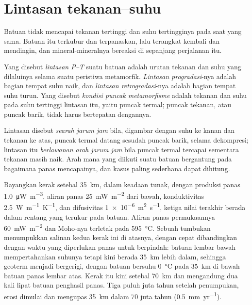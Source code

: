\section{Lintasan tekanan--suhu}\label{sec:b2:pt-paths:paths}

Batuan tidak mencapai tekanan tertinggi dan suhu tertingginya pada saat yang sama.
Batuan itu terkubur dan terpanaskan, lalu terangkat kembali dan mendingin, dan mineral-mineralnya bereaksi di sepanjang
perjalanan itu.

\begin{definition}\label{def:b2:pt-paths:paths}
Yang disebut \emph{lintasan P--T} suatu batuan adalah urutan tekanan dan
suhu yang dilaluinya selama suatu peristiwa metamorfik. \emph{Lintasan
progradasi}-nya adalah bagian tempat suhu naik, dan \emph{lintasan
retrogradasi}-nya adalah bagian tempat suhu turun. Yang disebut \emph{kondisi puncak
metamorfisme} adalah tekanan dan suhu pada
suhu tertinggi lintasan itu, yaitu puncak termal; puncak tekanan, atau puncak barik, tidak
harus bertepatan dengannya.
\end{definition}

Lintasan disebut \emph{searah jarum jam} bila, digambar dengan suhu ke kanan dan tekanan ke atas,
puncak termal datang sesudah puncak barik, selama dekompresi; lintasan itu
\emph{berlawanan arah jarum jam} bila puncak termal tercapai sementara tekanan masih naik. Arah
mana yang diikuti suatu batuan bergantung pada bagaimana panas mencapainya, dan kasus paling sederhana dapat
dihitung.

Bayangkan kerak setebal \qty{35}{km}, dalam keadaan tunak, dengan produksi panas
\qty{1.0}{\micro W.m^{-3}}, aliran panas \qty{25}{mW.m^{-2}} dari bawah, konduktivitas
\qty{2.5}{W.m^{-1}.K^{-1}}, dan difusivitas \qty{1e-6}{m^2.s^{-1}}, ketiga nilai terakhir
berada dalam rentang yang terukur pada batuan. Aliran panas permukaannya \qty{60}{mW.m^{-2}} dan Moho-nya terletak pada
\qty{595}{\celsius}. Sebuah tumbukan menumpukkan salinan kedua kerak ini di atasnya, dengan cepat
dibandingkan dengan waktu yang diperlukan panas untuk berpindah: batuan lembar bawah mempertahankan
suhunya tetapi kini berada \qty{35}{km} lebih dalam, sehingga geoterm menjadi bergerigi, dengan
batuan bersuhu \qty{0}{\celsius} pada \qty{35}{km} di bawah batuan panas lembar atas. Kerak itu
kini setebal \qty{70}{km} dan mengandung dua kali lipat batuan penghasil panas. Tiga puluh juta tahun setelah
penumpukan, erosi dimulai dan mengupas \qty{35}{km} dalam 70 juta tahun
(\qty{0.5}{mm.yr^{-1}}).

